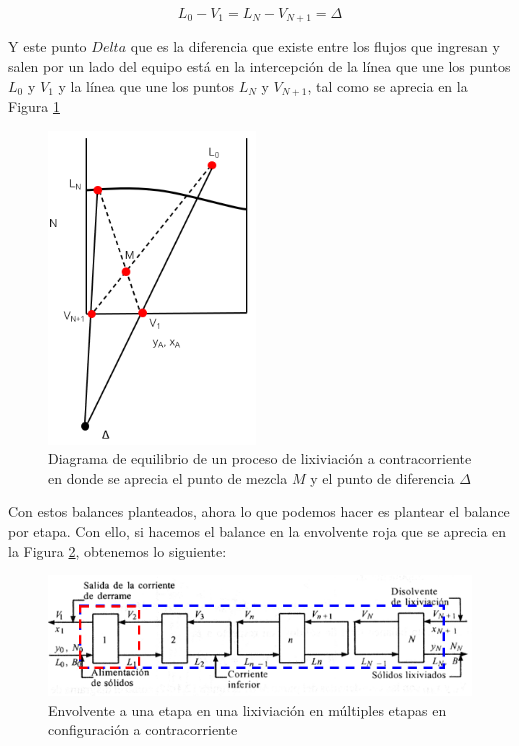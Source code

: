 \documentclass[11pt]{book}
\begin{document}
\begin{equation}
    \label{eq:Lixiviacion_10}
    L_0 - V_{1} = L_N - V_{N+1} = \Delta
\end{equation}

Y este punto $Delta$ que es la diferencia que existe entre los flujos que ingresan y salen por un lado del equipo está en la intercepción de la línea que une los puntos $L_0$ y $V_1$ y la línea que une los puntos $L_N$ y $V_{N+1}$, tal como se aprecia en la Figura \ref{fig:Lixiviacion_8}

\begin{figure}[H]
    \centering
    \includegraphics[width = 5.5cm]{img/lixiviacion/EquilibrioLixiviacion_8.PNG}
    \caption{Diagrama de equilibrio de un proceso de lixiviación a contracorriente en donde se aprecia el punto de mezcla $M$ y el punto de diferencia $\Delta$}
    \label{fig:Lixiviacion_8}
\end{figure}

Con estos balances planteados, ahora lo que podemos hacer es plantear el balance por etapa. Con ello, si hacemos el balance en la envolvente roja que se aprecia en la Figura \ref{fig:Lixiviacion_7}, obtenemos lo siguiente:

\begin{figure}[H]
    \centering
    \includegraphics[width = 13 cm]{img/lixiviacion/EquilibrioLixiviacion_7.PNG}
    \caption{Envolvente a una etapa en una lixiviación en múltiples etapas en configuración a contracorriente}
    \label{fig:Lixiviacion_7}
\end{figure}
\end{document}
